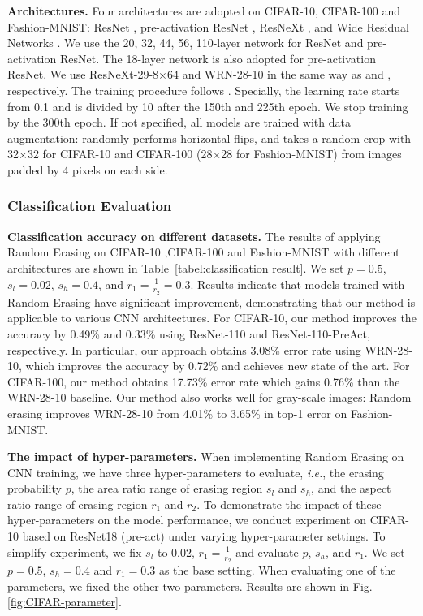 \documentclass[10pt,twocolumn,letterpaper]{article}
\begin{document}
\textbf{Architectures.} Four architectures are adopted on CIFAR-10, CIFAR-100 and Fashion-MNIST: ResNet \cite{resnet}, pre-activation ResNet \cite{he2016identity}, ResNeXt \cite{xie2016aggregated}, and Wide Residual Networks \cite{zagoruyko2016wide}. %
We use the 20, 32, 44, 56, 110-layer network for ResNet and pre-activation ResNet. The 18-layer network is also adopted for pre-activation ResNet. We use ResNeXt-29-8$\times$64 and WRN-28-10 in the same way as \cite{xie2016aggregated} and \cite{zagoruyko2016wide}, respectively.  
The training procedure follows \cite{resnet}. Specially, the learning rate
starts from 0.1 and is divided by 10 after the 150th and 225th epoch. We stop training by the 300th epoch. If not specified, all models are trained with data augmentation: randomly performs horizontal flips, and takes a random crop with 32$\times$32 for CIFAR-10 and CIFAR-100 (28$\times$28 for Fashion-MNIST) from images padded by 4 pixels on each side. 


\subsubsection{Classification Evaluation}
\label{Classification Evaluation}
\textbf{Classification accuracy on different datasets.}
The results of applying Random Erasing on CIFAR-10 ,CIFAR-100 and Fashion-MNIST with different architectures are shown in Table~\ref{tabel:classification result}. We set $p = 0.5$, $s_l = 0.02$, $s_h = 0.4$, and $r_1 = \frac{1}{r_2} = 0.3$. Results indicate that models trained with Random Erasing have significant improvement, demonstrating that our method is applicable to various CNN architectures. For CIFAR-10, our method improves the accuracy by 0.49\% and 0.33\% using ResNet-110 and ResNet-110-PreAct, respectively. In particular, our approach obtains 3.08\% error rate  using WRN-28-10, which improves the accuracy by 0.72\% and achieves new state of the art. For CIFAR-100, our method obtains 17.73\% error rate which gains 0.76\% than the WRN-28-10 baseline. Our method  also works well for gray-scale images: Random erasing improves WRN-28-10 from 4.01\% to 3.65\% in top-1 error on Fashion-MNIST.

\textbf{The impact of hyper-parameters.} When implementing Random Erasing on CNN training, we have three hyper-parameters to evaluate, \emph{i.e.}, the erasing probability $p$, the area ratio range of erasing region $s_l$  and $s_h$, and the aspect ratio range of erasing region $r_1$ and $r_2$. To demonstrate the impact of these hyper-parameters on the model performance, we conduct experiment on CIFAR-10 based on ResNet18 (pre-act) under varying hyper-parameter settings. To simplify experiment, we fix $s_l$ to 0.02, $r_1 = \frac{1}{r_2}$ and evaluate $p$, $s_h$, and $r_1$. We set $p=0.5$, $s_h=0.4$ and $r_1=0.3$ as the base setting.  When evaluating one of the parameters, we fixed the other two parameters. Results are shown in Fig. \ref{fig:CIFAR-parameter}.
\end{document}
